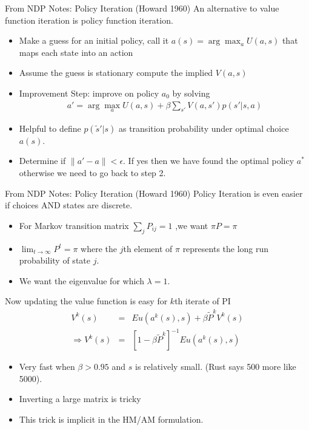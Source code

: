 \documentclass[xcolor=pdftex,dvipsnames,table,mathserif]{beamer}
\begin{document}
\begin{frame}{From NDP Notes: Policy Iteration (Howard 1960)}
An alternative to value function iteration is policy function iteration. 
\begin{itemize}
\item Make a guess for an initial policy, call it $a(s) = \arg \max_a U(a,s)$ that maps each state into an action
\item Assume the guess is stationary compute the implied $V(a,s)$
\item Improvement Step: improve on policy $a_0$ by solving 
\begin{eqnarray*}
a' = \arg \max_a U(a,s) + \beta \sum_{s'} V(a,s') p(s' | s,a)
\end{eqnarray*}
\item Helpful to define $p(\tilde{s}' | s)$ as transition probability under optimal choice $a(s)$.
\item Determine if $\| a' -a\| < \epsilon$. If yes then we have found the optimal policy $a^* $ otherwise we need to go back to step 2.
\end{itemize}
\end{frame}

\begin{frame}{From NDP Notes:  Policy Iteration (Howard 1960)}
Policy Iteration is even easier if choices AND states are discrete.
\begin{itemize}
\item For Markov transition matrix $\sum_j P_{ij} =1$ ,we want $\pi P = \pi$
\item $\lim_{t \rightarrow \infty} P^t = \pi$ where the $j$th element of $\pi$ represents the long run probability of state $j$.
\item We want the eigenvalue for which $\lambda = 1$.
\end{itemize}
Now updating the value function is easy for $k$th iterate of PI
\begin{eqnarray*}
V^k(s) &=& Eu(a^k(s),s) + \beta \tilde{P}^k V^k(s)\\
\Rightarrow V^k(s) &=& [1 - \beta \tilde{P}^k]^{-1} Eu(a^k(s),s)
\end{eqnarray*}
\begin{itemize}
\item Very fast when $\beta > 0.95$ and $s$ is relatively small. (Rust says 500 more like 5000).
\item Inverting a large matrix is tricky
\item \alert{This trick is implicit in the HM/AM formulation}.
\end{itemize}
\end{frame}
\end{document}

